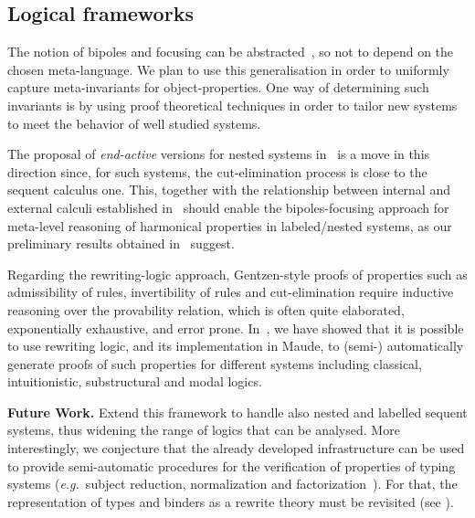 \documentclass[11pt,a4paper]{article}
\newcommand\eg{\hbox{\textit{e.g.}}}
\begin{document}
\subsection{Logical frameworks} 
The notion of bipoles and  focusing 
can be abstracted~\cite{daleSD17}, so not to depend on the chosen meta-language. We plan to use this generalisation in order to uniformly capture meta-invariants for object-properties. 
One way of determining such invariants is by using proof theoretical 
techniques in order to tailor new systems to meet the behavior of
well studied systems. 

The proposal of {\em end-active} versions for nested systems in~\cite{DBLP:journals/tocl/LellmannP19} is a move in this direction since, for such systems, 
the cut-elimination process is close to the sequent calculus one.
This, together with the  relationship between internal and external calculi established in~\cite{DBLP:conf/wollic/Pimentel18,DBLP:conf/tableaux/PimentelRL19} should enable the bipoles-focusing approach for meta-level reasoning of harmonical properties in labeled/nested systems, as our preliminary results obtained in~\cite{DBLP:conf/lsfa/OlartePX20} suggest.

Regarding the rewriting-logic approach, Gentzen-style  proofs of properties such as admissibility of rules, invertibility of rules and cut-elimination  require inductive reasoning over the provability relation, which is often quite elaborated, exponentially exhaustive, and error prone. In~\cite{DBLP:conf/wrla/OlartePR18,DBLP:journals/corr/abs-2101-03113}, we have showed that it is possible to use rewriting logic, and its implementation in Maude, to (semi-) automatically generate proofs of such properties for different systems including classical, intuitionistic, substructural and modal logics. 
%

{\bf Future Work.}
Extend this framework to handle also nested and labelled sequent systems, thus widening the range of logics that can be analysed.  More interestingly, we conjecture that the already developed infrastructure can be used to provide semi-automatic procedures for the verification of properties of typing systems (\eg\ subject reduction, normalization and factorization~\cite{DBLP:conf/csl/AccattoliFG21}). For that, the representation of types and binders as a rewrite theory must be revisited (see \cite{DBLP:conf/birthday/StehrM04}). 






 


\newpage

\setcounter{mainpartbegin}{\thepage}
\addtocounter{mainpartbegin}{-1}
\end{document}
